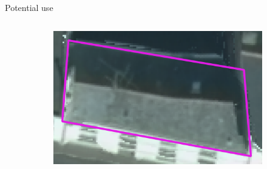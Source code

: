 \documentclass[10pt, export]{beamer}
\begin{document}
\begin{frame}{Potential use}
\begin{minipage}[0.2\textheight]{\textwidth}
\begin{columns}[T]
\begin{column}{0.48\textwidth}
{\begin{figure}
\begin{center}
\begin{subfigure}{.8\textwidth}
                                        \includegraphics[width=\textwidth]{images/use/incorrect_proj}
                                    \end{subfigure}
                                \end{center}
                            \end{figure}
                        }
\end{column}
\end{columns}
\end{minipage}
\end{frame}
\end{document}

